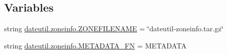 \subsection*{Variables}
\begin{DoxyCompactItemize}
\item 
string \hyperlink{namespacedateutil_1_1zoneinfo_af9a208789900d247feebe0cc8f89a716}{dateutil.\+zoneinfo.\+Z\+O\+N\+E\+F\+I\+L\+E\+N\+A\+ME} = \char`\"{}dateutil-\/zoneinfo.\+tar.\+gz\char`\"{}
\item 
string \hyperlink{namespacedateutil_1_1zoneinfo_a8fb7f83d54e56ffadaaa88c17f564453}{dateutil.\+zoneinfo.\+M\+E\+T\+A\+D\+A\+T\+A\+\_\+\+FN} = \textquotesingle{}M\+E\+T\+A\+D\+A\+TA\textquotesingle{}
\end{DoxyCompactItemize}
